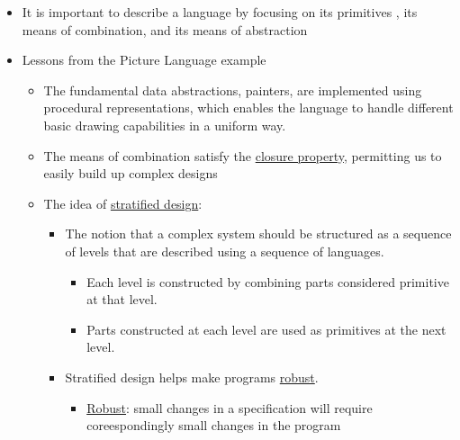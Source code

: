 \documentclass{article}
\begin{document}
\begin{itemize}
\item It is important to describe a language by focusing on its primitives , its means of combination, and its means of abstraction
\item Lessons from the Picture Language example
  \begin{itemize}
  \item The fundamental data abstractions, painters, are implemented using procedural representations, which enables the language to handle different basic drawing capabilities in a uniform way.
  \item The means of combination satisfy the \underline{closure property}, permitting us to easily build up complex designs
  \item The idea of \underline{stratified design}:
    \begin{itemize}
    \item The notion that a complex system should be structured as a sequence of levels that are described using a sequence of languages.
      \begin{itemize}
      \item Each level is constructed by combining parts considered primitive at that level.
        \item Parts constructed at each level are used as primitives at the next level.
      \end{itemize}
    \item Stratified design helps make programs \underline{robust}.
      \begin{itemize}
      \item \underline{Robust}: small changes in a specification will require coreespondingly small changes in the program
      \end{itemize}
    \end{itemize}
  \end{itemize}
\end{itemize}
\end{document}
